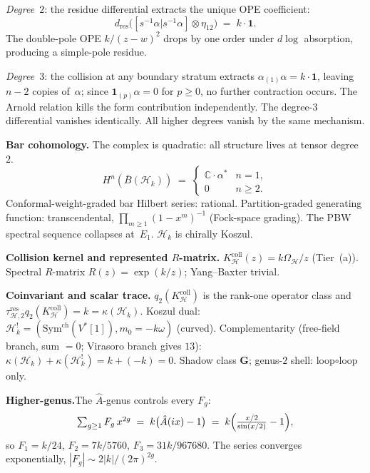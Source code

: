\documentclass[11pt,reqno]{amsart}
\theoremstyle{definition}
\theoremstyle{remark}
\providecommand{\cH}{\mathcal{H}}
\providecommand{\barB}{\bar{B}}
\providecommand{\Sym}{\mathrm{Sym}}
\providecommand{\bC}{\mathbb{C}}
\numberwithin{equation}{section}
\begin{document}
\emph{Degree~$2$}: the residue differential extracts the unique
OPE coefficient:
\[
d_{\mathrm{res}}\bigl([s^{-1}\alpha|s^{-1}\alpha]
\otimes\eta_{12}\bigr)
\;=\;k\cdot\mathbf{1}.
\]
The double-pole OPE $k/(z-w)^2$ drops by one order under $d\log$
absorption, producing a simple-pole residue.

\emph{Degree~$3$}: the collision at any boundary stratum extracts
$\alpha_{(1)}\alpha=k\cdot\mathbf{1}$, leaving $n-2$ copies
of~$\alpha$; since $\mathbf{1}_{(p)}\alpha=0$ for $p\ge 0$,
no further contraction occurs. The Arnold relation kills the
form contribution independently. The degree-$3$ differential
vanishes identically. All higher degrees vanish by the same
mechanism.

\medskip\noindent\textbf{Bar cohomology.}\enspace
The complex is quadratic: all structure lives at tensor degree~$2$.
\[
H^n(\barB(\cH_k))\;=\;
\begin{cases}
\bC\cdot\alpha^* & n=1,\\
0 & n\ge 2.
\end{cases}
\]
Conformal-weight-graded bar Hilbert series: rational.
Partition-graded generating function: transcendental,
$\prod_{m\ge 1}(1-x^m)^{-1}$ (Fock-space grading).
The PBW spectral sequence collapses at~$E_1$. $\cH_k$ is
chirally Koszul.

\medskip\noindent\textbf{Collision kernel and represented $R$-matrix.}\enspace
$K_{\cH}^{\mathrm{coll}}(z)=k\Omega_{\cH}/z$ (Tier~(a)). Spectral $R$-matrix
$R(z)=\exp(k/z)$; Yang--Baxter trivial.

\medskip\noindent\textbf{Coinvariant and scalar trace.}\enspace
$q_2(K_{\cH}^{\mathrm{coll}})$ is the rank-one operator class and
$\tau_{\cH,2}^{\mathrm{res}}q_2(K_{\cH}^{\mathrm{coll}})=k
=\kappa(\cH_k)$. Koszul dual:
$\cH_k^!=(\Sym^{\mathrm{ch}}(V^*[1]),m_0=-k\omega)$ (curved).
Complementarity (free-field branch, sum $=0$; Virasoro branch
gives $13$):
$\kappa(\cH_k)+\kappa(\cH_k^!)=k+(-k)=0$.
Shadow class $\mathbf{G}$; genus-$2$ shell: loop$\circ$loop only.

\medskip\noindent\textbf{Higher-genus.}\enspace The $\hat A$-genus controls every $F_g$:
\begin{equation}\label{eq:ahat-universality-preface-b}
\textstyle\sum_{g\ge 1} F_g\, x^{2g}
\;=\;
k\bigl(\hat A(ix)-1\bigr)
\;=\;
k\Bigl(\tfrac{x/2}{\sin(x/2)}-1\Bigr),
\end{equation}
so $F_1 = k/24$, $F_2 = 7k/5760$, $F_3 = 31k/967680$. The series
converges exponentially, $|F_g| \sim 2|k|/(2\pi)^{2g}$.
\end{document}
